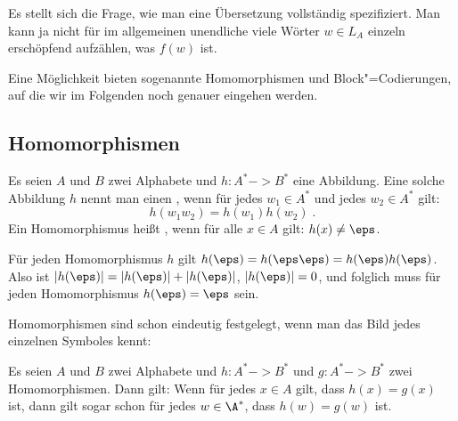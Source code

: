 Es stellt sich die Frage, wie man eine Übersetzung vollständig
spezifiziert. 
%
Man kann ja nicht für im allgemeinen unendliche viele Wörter
$w\in L_A$ einzeln erschöpfend aufzählen, was $f(w)$ ist.

Eine Möglichkeit bieten sogenannte Homomorphismen und
Block"=Codierungen, auf die wir im Folgenden noch genauer eingehen
werden.

\Tut\subsection{Homomorphismen}
\label{subsub:homomorphismus}

Es seien $A$ und $B$ zwei Alphabete und $h:A^*->B^*$ eine Abbildung. 
%
Eine solche Abbildung $h$ nennt man einen
,
wenn für jedes $w_1\in A^*$ und jedes $w_2\in A^*$ gilt:
\[
  h(w_1w_2) = h(w_1) h(w_2) \;.
\]
%
Ein Homomorphismus heißt , wenn
für alle $x\in A$ gilt: $h(x) \not=\eps$.

Für jeden Homomorphismus $h$ gilt
$h(\eps) = h(\eps\eps) = h(\eps) h(\eps)$. Also ist
$|h(\eps)| = |h(\eps)|+|h(\eps)|$, \dh $|h(\eps)| =0$, und folglich
muss für jeden Homomorphismus $h(\eps)=\eps$ sein.

Homomorphismen sind schon eindeutig festgelegt, wenn man das Bild
jedes einzelnen Symboles kennt:
%
\begin{lemma}
  Es seien $A$ und $B$ zwei Alphabete und $h:A^*->B^*$ und
  $g:A^*->B^*$ zwei Homomorphismen. Dann gilt:
  Wenn für jedes $x\in A$ gilt, dass $h(x)=g(x)$ ist, dann gilt sogar
  schon für jedes $w\in\A^*$, dass $h(w)=g(w)$ ist.
\end{lemma}

